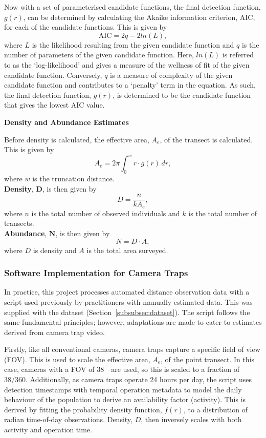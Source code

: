 Now with a set of parameterised candidate functions, the final detection function, $g(r)$, can be
determined by calculating the Akaike information criterion, AIC, for each of the candidate functions.
This is given by
\[
    \mathrm{AIC} = 2q - 2ln(L) \mathrm{,}
\]
where $L$ is the likelihood resulting from the given candidate function and $q$ is the number of
parameters of the given candidate function.
Here, $ln(L)$ is referred to as the `log-likelihood' and gives a measure of the wellness of fit of
the given candidate function.
Conversely, $q$ is a measure of complexity of the given candidate function and contributes to a
`penalty' term in the equation.
As such, the final detection function, $g(r)$, is determined to be the candidate function that gives
the lowest AIC value.

\clearpage
\textbf{Density and Abundance Estimates}

Before density is calculated, the effective area, $A_e$, of the transect is
calculated.
This is given by
\[
    A_e = 2\pi \int_{0}^{w} r \cdot g(r) \, dr \mathrm{,}
\]
where $w$ is the truncation distance.\\
\textbf{Density}, $\bm{D}$, is then given by
\[
    D = \dfrac{n}{kA_e} \mathrm{,}
\]
where $n$ is the total number of observed individuals and $k$ is the total number of transects.\\
\textbf{Abundance}, $\bm{N}$, is then given by
\[
    N = D \cdot A \mathrm{,}
\]
where $D$ is density and $A$ is the total area surveyed.


\subsubsection{Software Implementation for Camera Traps}

In practice, this project processes automated distance observation data with a script used
previously by practitioners with manually estimated data.
This was supplied with the dataset (Section~\ref{subsubsec:dataset}).
The script follows the same fundamental principles; however, adaptations are made to cater
to estimates derived from camera trap video.

Firstly, like all conventional cameras, camera traps capture a specific field of view (FOV).
This is used to scale the effective area, $A_e$, of the point transect.
In this case, cameras with a FOV of 38\textdegree~~are used, so this is scaled to a fraction
of 38/360.
Additionally, as camera traps operate 24 hours per day, the script uses detection timestamps
with temporal operation metadata to model the daily behaviour of the population to derive an
availability factor (activity).
This is derived by fitting the probability density function, $f(r)$, to a distribution of
radian time-of-day observations.
Density, $D$, then inversely scales with both activity and operation
time.\cite{ct_distance_sampling_1,ct_distance_sampling_2}

